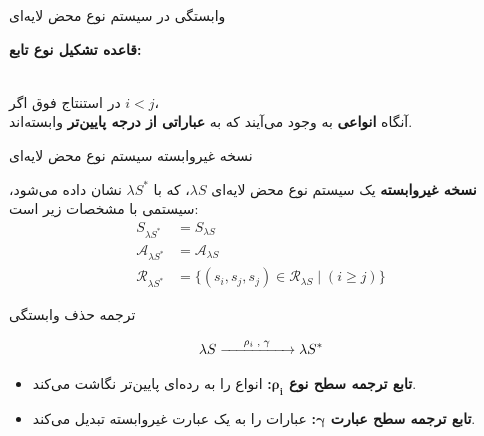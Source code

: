 \documentclass[12pt, aspectratio=169]{beamer}
\begin{document}
\begin{frame}{وابستگی در سیستم نوع محض لایه‌ای}

\textbf{قاعده تشکیل نوع تابع:}
\begin{prooftree}
\end{prooftree}

\hfil{}\\
در استنتاج فوق اگر
$i < j$،\\
آنگاه
\textbf{انواعی}
به وجود می‌آیند که به
\textbf{عباراتی از درجه پایین‌تر}
وابسته‌اند.

\end{frame}

\begin{frame}{نسخه غیروابسته سیستم نوع محض لایه‌ای}

\textbf{نسخه غیروابسته} یک سیستم نوع محض لایه‌ای
$\lambda S$،
که با
$\lambda S^*$
نشان داده می‌شود، سیستمی با مشخصات زیر است:
\begin{align*}
S_{\lambda S^*} &= S_{\lambda S}\\
\mathcal{A}_{\lambda S^*} &= \mathcal{A}_{\lambda S}\\
\mathcal{R}_{\lambda S^*} &= \{(s_i,s_j,s_j) \in \mathcal{R}_{\lambda S} \mid (i \ge j)\}
\end{align*}

\end{frame}

\begin{frame}{ترجمه حذف وابستگی }

{\Large
\begin{equation*}
\lambda S \xrightarrow{\hspace{0.5cm}\rho_i \;,\; \gamma\hspace{0.5cm}} \lambda S^*
\end{equation*}
}

\begin{itemize}
  \item \textbf{تابع ترجمه سطح نوع $\bm{\rho_i}$:} انواع را به رده‌ای پایین‌تر نگاشت می‌کند.
  \item \textbf{تابع ترجمه سطح عبارت $\bm{\gamma}$:} عبارات را به یک عبارت غیروابسته تبدیل می‌کند.
\end{itemize}


\end{frame}
\end{document}
